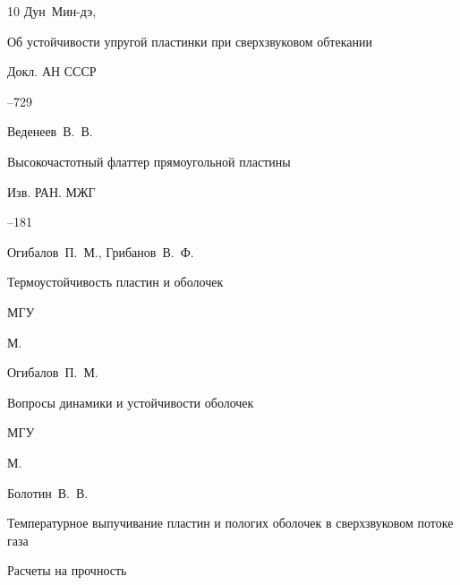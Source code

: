 \begin{thebibliography}{10}
\by Дун~Мин-дэ,

\paper Об устойчивости упругой пластинки при сверхзвуковом обтекании

\jour Докл. АН СССР




--729





\by Веденеев~В.~В. 

\paper Высокочастотный флаттер прямоугольной пластины

\jour Изв. РАН. МЖГ



--181










\by Огибалов~П.~М., Грибанов~В.~Ф.

\book Термоустойчивость пластин и оболочек


\publ МГУ

\publaddr М.









\by Огибалов~П.~М. 

\book Вопросы динамики и устойчивости оболочек


\publ МГУ

\publaddr М.








\by Болотин~В.~В.

\paper Температурное выпучивание пластин и пологих оболочек в сверхзвуковом потоке газа 

\inbook Расчеты на прочность


\end{thebibliography}
